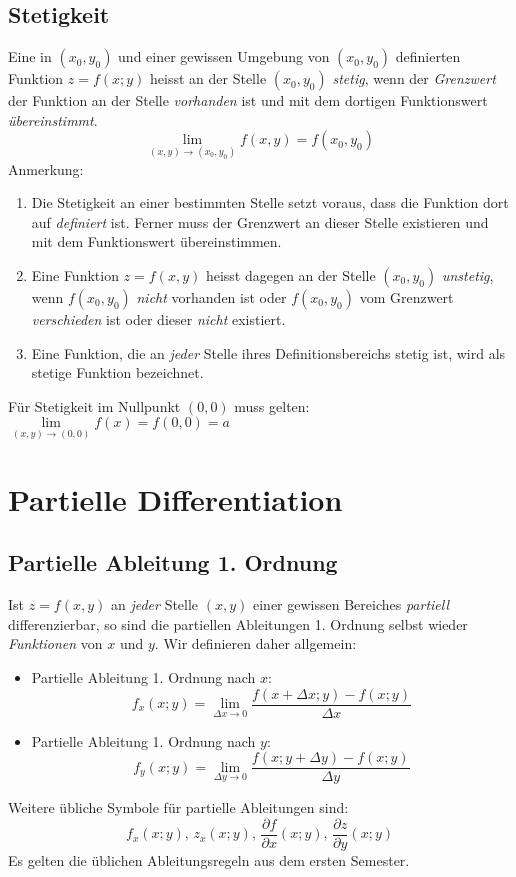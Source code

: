 \subsection{Stetigkeit}
\begin{definition}
Eine in $(x_0,y_0)$ und einer gewissen Umgebung von $(x_0,y_0)$ definierten Funktion $z = f(x;y)$ heisst an der Stelle $(x_0,y_0)$ \textit{stetig}, wenn der \textit{Grenzwert} der Funktion an der Stelle \textit{vorhanden} ist und mit dem dortigen Funktionswert \textit{übereinstimmt}.
$$\lim\limits_{(x,y) \rightarrow (x_0,y_0)} f(x,y) = f(x_0,y_0)$$
Anmerkung:
\begin{enumerate}
\item Die Stetigkeit an einer bestimmten Stelle setzt voraus, dass die Funktion dort auf \textit{definiert} ist. Ferner muss der Grenzwert an dieser Stelle existieren und mit dem Funktionswert übereinstimmen.
\item Eine Funktion $z = f(x,y)$ heisst dagegen an der Stelle $(x_0,y_0)$ \textit{unstetig}, wenn  $f(x_0,y_0)$ \textit{nicht} vorhanden ist oder $f(x_0,y_0)$ vom Grenzwert \textit{verschieden} ist oder dieser \textit{nicht} existiert.
\item Eine Funktion, die an \textit{jeder} Stelle ihres Definitionsbereichs stetig ist, wird als stetige Funktion bezeichnet.
\end{enumerate}
\end{definition}

Für Stetigkeit im Nullpunkt $(0, 0)$ muss gelten: $\lim\limits_{(x,y) \rightarrow (0,0)} f(x) = f(0,0) = a$


\section{Partielle Differentiation}
\subsection{Partielle Ableitung 1. Ordnung}
\begin{definition}
Ist $z = f(x,y)$ an \textit{jeder} Stelle $(x,y)$ einer gewissen Bereiches \textit{partiell} differenzierbar, so sind die partiellen Ableitungen 1. Ordnung selbst wieder \textit{Funktionen} von $x$ und $y$. Wir definieren daher allgemein:
\begin{itemize}
\item Partielle Ableitung 1. Ordnung nach $x$:
$$ f_x(x;y) = \lim\limits_{\Delta x \rightarrow 0} \frac{f(x+\Delta x; y) - f(x;y)}{\Delta x}$$
\item Partielle Ableitung 1. Ordnung nach $y$:
$$ f_y(x;y) = \lim\limits_{\Delta y \rightarrow 0} \frac{f(x;y +\Delta y) - f(x;y)}{\Delta y}$$
\end{itemize}
Weitere übliche Symbole für partielle Ableitungen sind:
$$f_x(x;y) \text{, } z_x(x;y) \text{, } \frac{\partial f}{\partial x} (x;y) \text{, } \frac{\partial z}{\partial y} (x;y)$$
Es gelten die üblichen Ableitungsregeln aus dem ersten Semester.
\end{definition}

